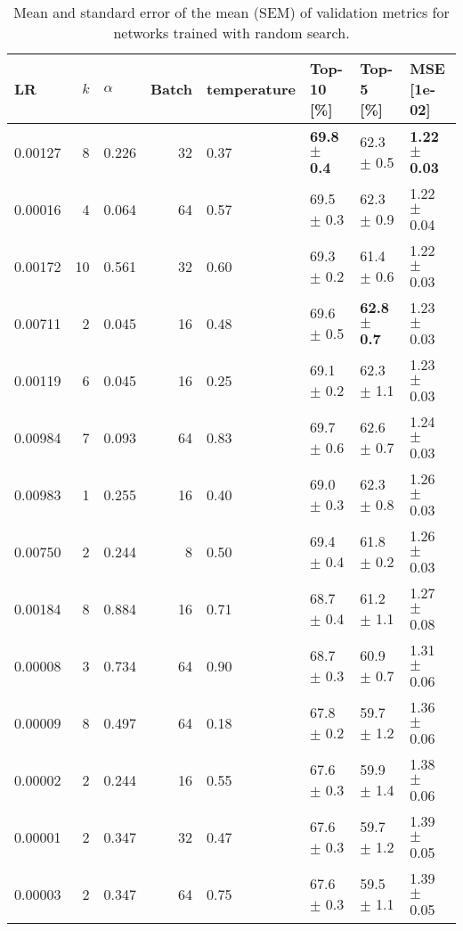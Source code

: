 \begin{table}[h]
\caption{Mean and standard error of the mean (SEM) of validation metrics for networks trained with random search. }
\label{tab:randomsearch}
\begin{tabular}{lrlrllll}
\toprule
LR & $k$ & $\alpha$ & Batch & temperature & Top-10 [\%] & Top-5 [\%] & MSE [1e-02] \\
\midrule
0.00127 & 8 & 0.226 & 32 & 0.37 & \textbf{69.8 $\pm$ 0.4} & 62.3 $\pm$ 0.5 & \textbf{1.22 $\pm$ 0.03} \\
0.00016 & 4 & 0.064 & 64 & 0.57 & 69.5 $\pm$ 0.3 & 62.3 $\pm$ 0.9 & 1.22 $\pm$ 0.04 \\
0.00172 & 10 & 0.561 & 32 & 0.60 & 69.3 $\pm$ 0.2 & 61.4 $\pm$ 0.6 & 1.22 $\pm$ 0.03 \\
0.00711 & 2 & 0.045 & 16 & 0.48 & 69.6 $\pm$ 0.5 & \textbf{62.8 $\pm$ 0.7} & 1.23 $\pm$ 0.03 \\
0.00119 & 6 & 0.045 & 16 & 0.25 & 69.1 $\pm$ 0.2 & 62.3 $\pm$ 1.1 & 1.23 $\pm$ 0.03 \\
0.00984 & 7 & 0.093 & 64 & 0.83 & 69.7 $\pm$ 0.6 & 62.6 $\pm$ 0.7 & 1.24 $\pm$ 0.03 \\
0.00983 & 1 & 0.255 & 16 & 0.40 & 69.0 $\pm$ 0.3 & 62.3 $\pm$ 0.8 & 1.26 $\pm$ 0.03 \\
0.00750 & 2 & 0.244 & 8 & 0.50 & 69.4 $\pm$ 0.4 & 61.8 $\pm$ 0.2 & 1.26 $\pm$ 0.03 \\
0.00184 & 8 & 0.884 & 16 & 0.71 & 68.7 $\pm$ 0.4 & 61.2 $\pm$ 1.1 & 1.27 $\pm$ 0.08 \\
0.00008 & 3 & 0.734 & 64 & 0.90 & 68.7 $\pm$ 0.3 & 60.9 $\pm$ 0.7 & 1.31 $\pm$ 0.06 \\
0.00009 & 8 & 0.497 & 64 & 0.18 & 67.8 $\pm$ 0.2 & 59.7 $\pm$ 1.2 & 1.36 $\pm$ 0.06 \\
0.00002 & 2 & 0.244 & 16 & 0.55 & 67.6 $\pm$ 0.3 & 59.9 $\pm$ 1.4 & 1.38 $\pm$ 0.06 \\
0.00001 & 2 & 0.347 & 32 & 0.47 & 67.6 $\pm$ 0.3 & 59.7 $\pm$ 1.2 & 1.39 $\pm$ 0.05 \\
0.00003 & 2 & 0.347 & 64 & 0.75 & 67.6 $\pm$ 0.3 & 59.5 $\pm$ 1.1 & 1.39 $\pm$ 0.05 \\
\bottomrule
\end{tabular}
\end{table}

